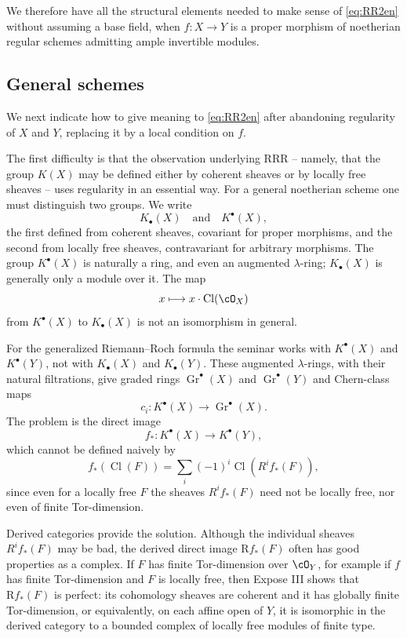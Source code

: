 \documentclass[11pt]{article}
\theoremstyle{plain}
\theoremstyle{definition}
\theoremstyle{remark}
\DeclareMathOperator{\Gr}{Gr}
\newcommand{\R}{\mathrm R}
\providecommand{\Cl}{\operatorname{Cl}}
\begin{document}
We therefore have all the structural elements needed to make sense of \eqref{eq:RR2en} without assuming a base field, when $f:X\to Y$ is a proper morphism of noetherian regular schemes admitting ample invertible modules.

\subsection{General schemes}

We next indicate how to give meaning to \eqref{eq:RR2en} after abandoning regularity of $X$ and $Y$, replacing it by a local condition on $f$.

The first difficulty is that the observation underlying RRR -- namely, that the group $K(X)$ may be defined either by coherent sheaves or by locally free sheaves -- uses regularity in an essential way. For a general noetherian scheme one must distinguish two groups. We write
\[
   K_{\bullet}(X) \quad\text{and}\quad K^{\bullet}(X),
\]
the first defined from coherent sheaves, covariant for proper morphisms, and the second from locally free sheaves, contravariant for arbitrary morphisms. The group $K^{\bullet}(X)$ is naturally a ring, and even an augmented $\lambda$-ring; $K_{\bullet}(X)$ is generally only a module over it. The map
\[
   x\longmapsto x\cdot \Cl(\cO_X)
\]
from $K^{\bullet}(X)$ to $K_{\bullet}(X)$ is not an isomorphism in general.

For the generalized Riemann--Roch formula the seminar works with $K^{\bullet}(X)$ and $K^{\bullet}(Y)$, not with $K_{\bullet}(X)$ and $K_{\bullet}(Y)$. These augmented $\lambda$-rings, with their natural filtrations, give graded rings $\Gr^{\bullet}(X)$ and $\Gr^{\bullet}(Y)$ and Chern-class maps
\[
   c_i:K^{\bullet}(X)\to\Gr^{\bullet}(X).
\]
The problem is the direct image
\begin{equation}\label{eq:fstarK}
   f_*:K^{\bullet}(X)\to K^{\bullet}(Y),
\end{equation}
which cannot be defined naively by
\[
   f_*(\Cl(F))=\sum_i(-1)^i\Cl(R^if_*(F)),
\]
since even for a locally free $F$ the sheaves $R^if_*(F)$ need not be locally free, nor even of finite Tor-dimension.

Derived categories provide the solution. Although the individual sheaves $R^if_*(F)$ may be bad, the derived direct image $\R f_*(F)$ often has good properties as a complex. If $F$ has finite Tor-dimension over $\cO_Y$, for example if $f$ has finite Tor-dimension and $F$ is locally free, then Expose III shows that $\R f_*(F)$ is perfect: its cohomology sheaves are coherent and it has globally finite Tor-dimension, or equivalently, on each affine open of $Y$, it is isomorphic in the derived category to a bounded complex of locally free modules of finite type.
\end{document}
